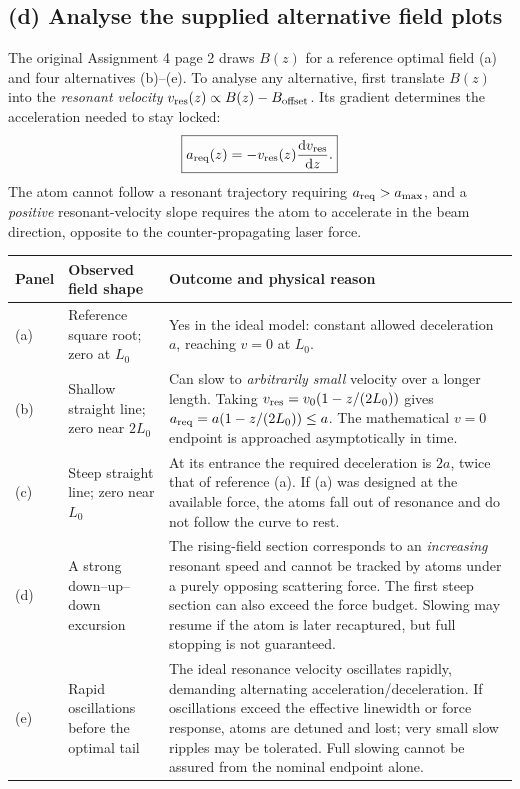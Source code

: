 \subsection*{(d) Analyse the supplied alternative field plots}
The original Assignment 4 page 2 draws
\(B(z)\) for a reference optimal field (a)
and four alternatives (b)--(e).
To analyse any alternative, first translate
\(B(z)\) into the \emph{resonant velocity}
\(v_{\rm res}(z)\propto B(z)-B_{\rm offset}\).
Its gradient determines the acceleration
needed to stay locked:
\[
\boxed{a_{\rm req}(z)=
-v_{\rm res}(z)\frac{\mathrm{d} v_{\rm res}}{\mathrm{d} z}.}
\]
The atom cannot follow a resonant trajectory
requiring \(a_{\rm req}>a_{\max}\), and a
\emph{positive} resonant-velocity slope requires
the atom to accelerate in the beam direction,
opposite to the counter-propagating laser force.

\begin{center}\small
\begin{tabularx}{\linewidth}{@{}p{8mm}p{34mm}X@{}}
\toprule
Panel&Observed field shape&Outcome and physical reason\\\midrule
(a)&Reference square root; zero at \(L_0\)&
Yes in the ideal model: constant allowed
deceleration \(a\), reaching \(v=0\) at \(L_0\).\\
(b)&Shallow straight line;
zero near \(2L_0\)&
Can slow to \emph{arbitrarily small} velocity
over a longer length. Taking
\(v_{\rm res}=v_0(1-z/(2L_0))\) gives
\(a_{\rm req}=a(1-z/(2L_0))\le a\).
The mathematical \(v=0\) endpoint is
approached asymptotically in time.\\
(c)&Steep straight line;
zero near \(L_0\)&
At its entrance the required deceleration is
\(2a\), twice that of reference (a).
If (a) was designed at the available force,
the atoms fall out of resonance and do not
follow the curve to rest.\\
(d)&A strong down--up--down excursion&
The rising-field section corresponds to
an \emph{increasing} resonant speed and cannot
be tracked by atoms under a purely opposing
scattering force. The first steep section can
also exceed the force budget. Slowing may
resume if the atom is later recaptured,
but full stopping is not guaranteed.\\
(e)&Rapid oscillations before the optimal tail&
The ideal resonance velocity oscillates rapidly,
demanding alternating acceleration/deceleration.
If oscillations exceed the effective linewidth
or force response, atoms are detuned and
lost; very small slow ripples may be tolerated.
Full slowing cannot be assured from the
nominal endpoint alone.\\
\bottomrule
\end{tabularx}
\end{center}

